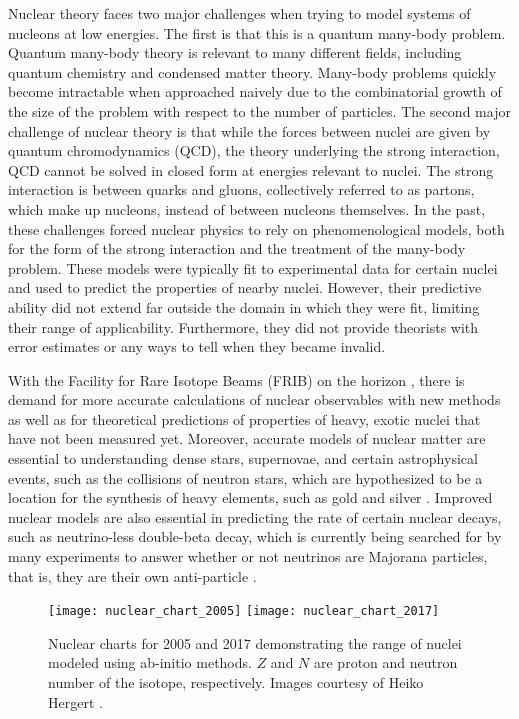 Nuclear theory faces two major challenges when trying to model systems of nucleons at low energies. The first is that this is a quantum many-body problem. Quantum many-body theory is relevant to many different fields, including quantum chemistry and condensed matter theory. Many-body problems quickly become intractable when approached naively due to the combinatorial growth of the size of the problem with respect to the number of particles. The second major challenge of nuclear theory is that while the forces between nuclei are given by quantum chromodynamics (QCD), the theory underlying the strong interaction, QCD cannot be solved in closed form at energies relevant to nuclei. The strong interaction is between quarks and gluons, collectively referred to as partons, which make up nucleons, instead of between nucleons themselves. In the past, these challenges forced nuclear physics to rely on phenomenological models, both for the form of the strong interaction and the treatment of the many-body problem. These models were typically fit to experimental data for certain nuclei and used to predict the properties of nearby nuclei. However, their predictive ability did not extend far outside the domain in which they were fit, limiting their range of applicability. Furthermore, they did not provide theorists with error estimates or any ways to tell when they became invalid.

With the Facility for Rare Isotope Beams (FRIB) on the horizon \cite{bollen2010frib}, there is demand for more accurate calculations of nuclear observables with new methods as well as for theoretical predictions of properties of heavy, exotic nuclei that have not been measured yet. Moreover, accurate models of nuclear matter are essential to understanding dense stars, supernovae, and certain astrophysical events, such as the collisions of neutron stars, which are hypothesized to be a location for the synthesis of heavy elements, such as gold and silver \cite{abbott2017gw170817}. Improved nuclear models are also essential in predicting the rate of certain nuclear decays, such as neutrino-less double-beta decay, which is currently being searched for by many experiments to answer whether or not neutrinos are Majorana particles, that is, they are their own anti-particle \cite{DellOro:2016tmg}.

\begin{figure}[t]
    \begin{center}
        \texttt{[image: nuclear\_chart\_2005]}
        \texttt{[image: nuclear\_chart\_2017]}
    \end{center}
    \caption{Nuclear charts for 2005 and 2017 demonstrating the range of nuclei modeled using ab-initio methods. $Z$ and $N$ are proton and neutron number of the isotope, respectively. Images courtesy of Heiko Hergert \cite{Hergert:2015awm}.}
    \label{fig:nuclchart}
\end{figure}

